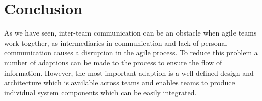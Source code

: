 \section{Conclusion}\label{sec:conclusion}
As we have seen, inter-team communication can be an obstacle when agile teams work together, as intermediaries in communication and lack of personal communication causes a disruption in the agile process.
To reduce this problem a number of adaptions can be made to the process to ensure the flow of information.
However, the most important adaption is a well defined design and architecture which is available across teams and enables teams to produce individual system components which can be easily integrated.
